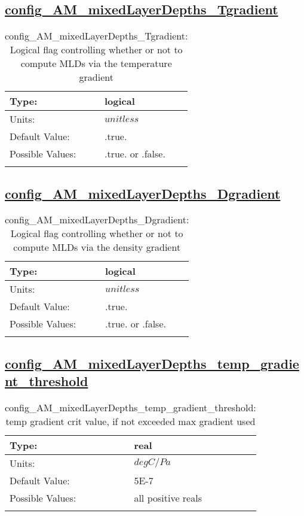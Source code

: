 \subsection[config\_AM\_mixedLayerDepths\_Tgradient]{\hyperref[sec:nm_tab_AM_mixedLayerDepths]{config\_AM\_mixedLayerDepths\_Tgradient}}
\label{subsec:nm_sec_config_AM_mixedLayerDepths_Tgradient}
\begin{center}
\begin{longtable}{| p{2.0in} || p{4.0in} |}
    \hline
    Type: & logical \\
    \hline
    Units: & $unitless$ \\
    \hline
    Default Value: & .true. \\
    \hline
    Possible Values: & .true. or .false. \\
    \hline
    \caption{config\_AM\_mixedLayerDepths\_Tgradient: Logical flag controlling whether or not to compute MLDs via the temperature gradient}
\end{longtable}
\end{center}
\subsection[config\_AM\_mixedLayerDepths\_Dgradient]{\hyperref[sec:nm_tab_AM_mixedLayerDepths]{config\_AM\_mixedLayerDepths\_Dgradient}}
\label{subsec:nm_sec_config_AM_mixedLayerDepths_Dgradient}
\begin{center}
\begin{longtable}{| p{2.0in} || p{4.0in} |}
    \hline
    Type: & logical \\
    \hline
    Units: & $unitless$ \\
    \hline
    Default Value: & .true. \\
    \hline
    Possible Values: & .true. or .false. \\
    \hline
    \caption{config\_AM\_mixedLayerDepths\_Dgradient: Logical flag controlling whether or not to compute MLDs via the density gradient}
\end{longtable}
\end{center}
\subsection[config\_AM\_mixedLayerDepths\_temp\_gradient\_threshold]{\hyperref[sec:nm_tab_AM_mixedLayerDepths]{config\_AM\_mixedLayerDepths\_temp\_gradient\_threshold}}
\label{subsec:nm_sec_config_AM_mixedLayerDepths_temp_gradient_threshold}
\begin{center}
\begin{longtable}{| p{2.0in} || p{4.0in} |}
    \hline
    Type: & real \\
    \hline
    Units: & $degC/Pa$ \\
    \hline
    Default Value: & 5E-7 \\
    \hline
    Possible Values: & all positive reals \\
    \hline
    \caption{config\_AM\_mixedLayerDepths\_temp\_gradient\_threshold: temp gradient crit value, if not exceeded max gradient used}
\end{longtable}
\end{center}
